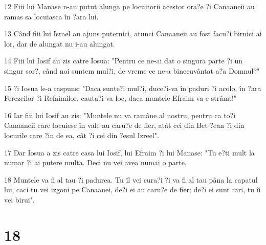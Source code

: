 \par 12 Fiii lui Manase n-au putut alunga pe locuitorii acestor ora?e ?i Canaaneii au ramas sa locuiasca în ?ara lui.
\par 13 Când fiii lui Israel au ajuns puternici, atunci Canaaneii au fost facu?i birnici ai lor, dar de alungat nu i-au alungat.
\par 14 Fiii lui Iosif au zis catre Iosua: "Pentru ce ne-ai dat o singura parte ?i un singur sor?, când noi suntem mul?i, de vreme ce ne-a binecuvântat a?a Domnul?"
\par 15 ?i Iosua le-a raspuns: "Daca sunte?i mul?i, duce?i-va în paduri ?i acolo, în ?ara Ferezeilor ?i Refaimilor, cauta?i-va loc, daca muntele Efraim va e strâmt!"
\par 16 Iar fiii lui Iosif au zis: "Muntele nu va ramâne al nostru, pentru ca to?i Canaaneii care locuiesc în vale au caru?e de fier, atât cei din Bet-?ean ?i din locurile care ?in de ea, cât ?i cei din ?esul Izreel".
\par 17 Dar Iosua a zis catre casa lui Iosif, lui Efraim ?i lui Manase: "Tu e?ti mult la numar ?i ai putere multa. Deci nu vei avea numai o parte.
\par 18 Muntele va fi al tau ?i padurea. Tu îl vei cura?i ?i va fi al tau pâna la capatul lui, caci tu vei izgoni pe Canaanei, de?i ei au caru?e de fier; de?i ei sunt tari, tu îi vei birui".

\chapter{18}

